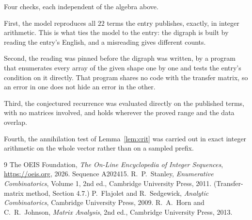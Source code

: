\documentclass[11pt,a4paper]{article}
\theoremstyle{plain}
\theoremstyle{definition}
\begin{document}
Four checks, each independent of the algebra above.

First, the model reproduces all $22$ terms the entry publishes, exactly, in integer
arithmetic. This is what ties the model to the entry: the digraph is built by reading the
entry's English, and a misreading gives different counts.

Second, the reading was pinned before the digraph was written, by a program that enumerates
every array of the given shape one by one and tests the entry's condition on it directly. That program shares no code with the transfer matrix, so an error in one does not
hide an error in the other.

Third, the conjectured recurrence was evaluated directly on the published terms, with no
matrices involved, and holds wherever the proved range and the data overlap.

Fourth, the annihilation test of Lemma~\ref{lem:crit} was carried out in exact integer
arithmetic on the whole vector rather than on a sampled prefix.

\begin{thebibliography}{9}
 The OEIS Foundation, \emph{The On-Line Encyclopedia of Integer
Sequences}, \url{https://oeis.org}, 2026. Sequence A202415.
 R.~P.~Stanley, \emph{Enumerative Combinatorics}, Volume 1, 2nd ed.,
Cambridge University Press, 2011. (Transfer-matrix method, Section 4.7.)
 P.~Flajolet and R.~Sedgewick, \emph{Analytic Combinatorics}, Cambridge
University Press, 2009.
 R.~A.~Horn and C.~R.~Johnson, \emph{Matrix Analysis}, 2nd ed., Cambridge
University Press, 2013.
\end{thebibliography}
\end{document}
